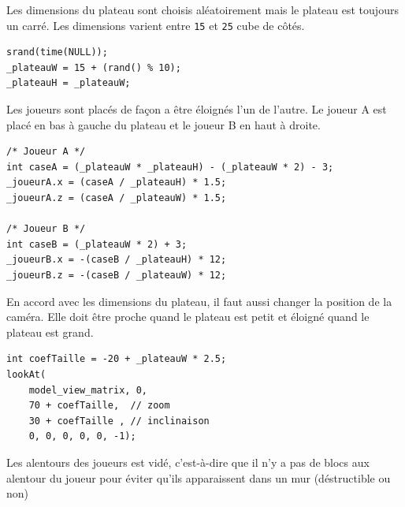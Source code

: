 \documentclass{article}
\begin{document}
    Les dimensions du plateau sont choisis aléatoirement mais le plateau est toujours un carré. Les dimensions varient entre \texttt{15} et \texttt{25} cube de côtés.
    \begin{center}\begin{minipage}{0.5\textwidth}
        \begin{verbatim}
srand(time(NULL));
_plateauW = 15 + (rand() % 10);
_plateauH = _plateauW;
        \end{verbatim}
    \end{minipage}\end{center}
    \vspace{10pt}

    Les joueurs sont placés de façon a être éloignés l'un de l'autre. Le joueur A est placé en bas à gauche du plateau et le joueur B en haut à droite.
    \begin{center}\begin{minipage}{0.8\textwidth}
        \begin{verbatim}
/* Joueur A */
int caseA = (_plateauW * _plateauH) - (_plateauW * 2) - 3;
_joueurA.x = (caseA / _plateauH) * 1.5;
_joueurA.z = (caseA / _plateauW) * 1.5;

/* Joueur B */
int caseB = (_plateauW * 2) + 3;
_joueurB.x = -(caseB / _plateauH) * 12;
_joueurB.z = -(caseB / _plateauW) * 12;
        \end{verbatim}
    \end{minipage}\end{center}
    \vspace{10pt}

    En accord avec les dimensions du plateau, il faut aussi changer la position de la caméra. Elle doit être proche quand le plateau est petit et éloigné quand le plateau est grand.
    \begin{center}\begin{minipage}{0.5\textwidth}
        \begin{verbatim}
int coefTaille = -20 + _plateauW * 2.5;
lookAt(
    model_view_matrix, 0,
    70 + coefTaille,  // zoom
    30 + coefTaille , // inclinaison
    0, 0, 0, 0, 0, -1);
        \end{verbatim}
    \end{minipage}\end{center}
    \vspace{10pt}

    Les alentours des joueurs est vidé, c'est-à-dire que il n'y a pas de blocs aux alentour du joueur pour éviter qu'ils apparaissent dans un mur (déstructible ou non)
    \vspace{10pt}
\end{document}
